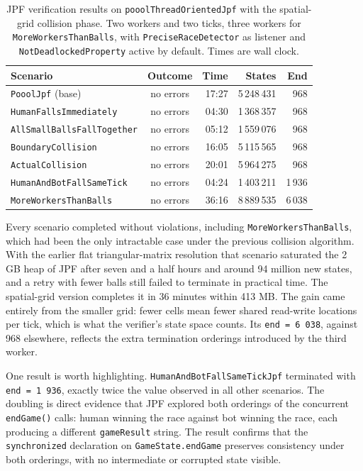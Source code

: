 \documentclass{scrartcl}
\begin{document}
\begin{table}[H]
    \centering
    \begin{tabular}{@{}lcrrr@{}}
        \toprule
        \textbf{Scenario} & \textbf{Outcome} & \textbf{Time} & \textbf{States} & \textbf{End} \\ \midrule
        \texttt{PooolJpf} (base)           & no errors & 17:27 & 5\,248\,431 & 968 \\
        \texttt{HumanFallsImmediately}     & no errors & 04:30 & 1\,368\,357 & 968 \\
        \texttt{AllSmallBallsFallTogether} & no errors & 05:12 & 1\,559\,076 & 968 \\
        \texttt{BoundaryCollision}         & no errors & 16:05 & 5\,115\,565 & 968 \\
        \texttt{ActualCollision}           & no errors & 20:01 & 5\,964\,275 & 968 \\
        \texttt{HumanAndBotFallSameTick}   & no errors & 04:24 & 1\,403\,211 & 1\,936 \\
        \texttt{MoreWorkersThanBalls}      & no errors & 36:16 & 8\,889\,535 & 6\,038 \\
        \bottomrule
    \end{tabular}
    \caption{JPF verification results on \texttt{pooolThreadOrientedJpf} with the spatial-grid collision phase. Two workers and two ticks, three workers for \texttt{MoreWorkersThanBalls}, with \texttt{PreciseRaceDetector} as listener and \texttt{NotDeadlockedProperty} active by default. Times are wall clock.}
    \label{tab:jpf_results}
\end{table}

Every scenario completed without violations, including \texttt{MoreWorkersThanBalls}, which had been the only intractable case under the previous collision algorithm. With the earlier flat triangular-matrix resolution that scenario saturated the 2 GB heap of JPF after seven and a half hours and around 94 million new states, and a retry with fewer balls still failed to terminate in practical time. The spatial-grid version completes it in 36 minutes within 413 MB. The gain came entirely from the smaller grid: fewer cells mean fewer shared read-write locations per tick, which is what the verifier's state space counts. Its \texttt{end = 6\,038}, against 968 elsewhere, reflects the extra termination orderings introduced by the third worker.

One result is worth highlighting. \texttt{HumanAndBotFallSameTickJpf} terminated with \texttt{end = 1\,936}, exactly twice the value observed in all other scenarios. The doubling is direct evidence that JPF explored both orderings of the concurrent \texttt{endGame()} calls: human winning the race against bot winning the race, each producing a different \texttt{gameResult} string. The result confirms that the \texttt{synchronized} declaration on \texttt{GameState.endGame} preserves consistency under both orderings, with no intermediate or corrupted state visible.
\end{document}

